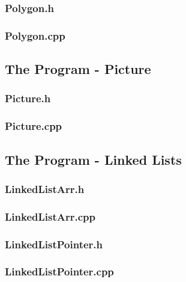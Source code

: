 \documentclass[11pt,titlepage]{article}
\begin{document}
			\subsubsection{Polygon.h}
				
				
			\subsubsection{Polygon.cpp}
				
		
		\subsection{The Program - Picture}
			\subsubsection{Picture.h}
				
			
			\subsubsection{Picture.cpp}
				
		
		\subsection{The Program - Linked Lists}
			\subsubsection{LinkedListArr.h}
				
			
			\subsubsection{LinkedListArr.cpp}
				
			
			\subsubsection{LinkedListPointer.h}
				
				
			\subsubsection{LinkedListPointer.cpp}
				
				

		
	
\end{document}
